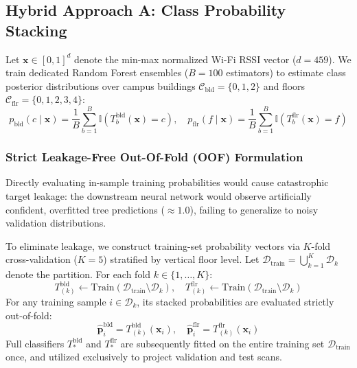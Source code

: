 \subsection{Hybrid Approach A: Class Probability Stacking}
\label{subsec:stacking}

Let $\mathbf{x} \in [0, 1]^d$ denote the min-max normalized Wi-Fi RSSI vector ($d=459$). We train dedicated Random Forest ensembles ($B=100$ estimators) to estimate class posterior distributions over campus buildings $\mathcal{C}_{\text{bld}} = \{0, 1, 2\}$ and floors $\mathcal{C}_{\text{flr}} = \{0, 1, 2, 3, 4\}$:
\begin{equation}
\label{eq:rf-posteriors}
p_{\text{bld}}(c \mid \mathbf{x}) = \frac{1}{B} \sum_{b=1}^B \mathbb{I}(T_b^{\text{bld}}(\mathbf{x}) = c), \quad
p_{\text{flr}}(f \mid \mathbf{x}) = \frac{1}{B} \sum_{b=1}^B \mathbb{I}(T_b^{\text{flr}}(\mathbf{x}) = f)
\end{equation}

\subsubsection{Strict Leakage-Free Out-Of-Fold (OOF) Formulation}
Directly evaluating in-sample training probabilities would cause catastrophic target leakage: the downstream neural network would observe artificially confident, overfitted tree predictions ($\approx 1.0$), failing to generalize to noisy validation distributions. 

To eliminate leakage, we construct training-set probability vectors via $K$-fold cross-validation ($K=5$) stratified by vertical floor level. Let $\mathcal{D}_{\text{train}} = \bigcup_{k=1}^K \mathcal{D}_k$ denote the partition. For each fold $k \in \{1, \dots, K\}$:
\begin{equation}
T_{(k)}^{\text{bld}} \leftarrow \text{Train}\left(\mathcal{D}_{\text{train}} \setminus \mathcal{D}_k\right), \quad
T_{(k)}^{\text{flr}} \leftarrow \text{Train}\left(\mathcal{D}_{\text{train}} \setminus \mathcal{D}_k\right)
\end{equation}
For any training sample $i \in \mathcal{D}_k$, its stacked probabilities are evaluated strictly out-of-fold:
\begin{equation}
\hat{\mathbf{p}}_i^{\text{bld}} = T_{(k)}^{\text{bld}}(\mathbf{x}_i), \quad
\hat{\mathbf{p}}_i^{\text{flr}} = T_{(k)}^{\text{flr}}(\mathbf{x}_i)
\end{equation}
Full classifiers $T_{*}^{\text{bld}}$ and $T_{*}^{\text{flr}}$ are subsequently fitted on the entire training set $\mathcal{D}_{\text{train}}$ once, and utilized exclusively to project validation and test scans.

